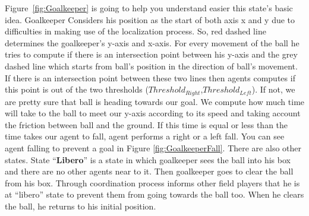 Figure~\ref{fig:Goalkeeper} is going to help you understand easier this state's basic idea. Goalkeeper Considers his position as the start of both axis x and y due to difficulties in making use of the localization process. So, red dashed line determines the goalkeeper's y-axis and x-axis. For every movement of the ball he tries to compute if there is an intersection point between his y-axis and the grey dashed line which starts from ball's position in the direction of ball's movement. If there is an intersection point between these two lines then agents computes if this point is out of the two thresholds ($Threshold_{Right}$,$Threshold_{Left}$). If not, we are pretty sure that ball is heading towards our goal. We compute how much time will take to the ball to meet our y-axis according to its speed and taking account the friction between ball and the ground. If this time is equal or less than the time takes our agent to fall, agent performs a right or a left fall. You can see agent falling to prevent a goal in Figure \ref{fig:GoalkeeperFall}. There are also other states. State ``\textbf{Libero}'' is a state in which goalkeeper sees the ball into his box and there are no other agents near to it. Then goalkeeper goes to clear the ball from his box. Through coordination process informs other field players that he is at ``libero'' state to prevent them from going towards the ball too. When he clears the ball, he returns to his initial position. 

